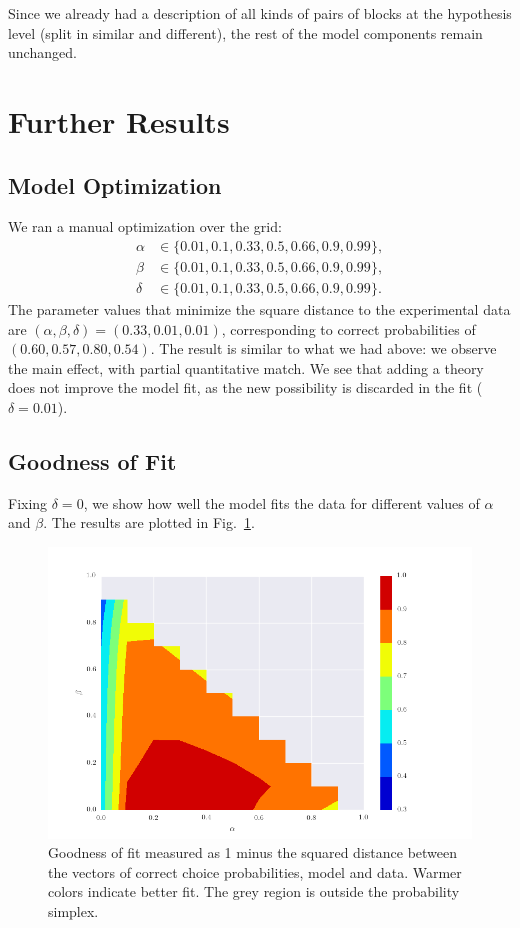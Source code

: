 \documentclass[11pt, a4paper]{article}
\begin{document}
Since we already had a description of all kinds of pairs of blocks at the hypothesis level (split in similar and different), the rest of the model components remain unchanged. 
 
\section*{Further Results}
\subsection*{Model Optimization}
We ran a manual optimization over the grid:
\begin{equation}
\begin{split}
\alpha&\in\{0.01, 0.1, 0.33, 0.5, 0.66, 0.9, 0.99\},\\
\beta&\in\{0.01, 0.1, 0.33, 0.5, 0.66, 0.9, 0.99\},\\
\delta&\in\{0.01, 0.1, 0.33, 0.5, 0.66, 0.9, 0.99\}.
\end{split}
\end{equation}
The parameter values that minimize the square distance to the experimental data are $(\alpha, \beta, \delta)=(0.33,0.01,0.01)$, corresponding to correct probabilities of $(0.60, 0.57, 0.80, 0.54)$. The result is similar to what we had above: we observe the main effect, with partial quantitative match. We see that adding a theory does not improve the model fit, as the new possibility is discarded in the fit ($\delta=0.01$). 
 
\subsection*{Goodness of Fit}
Fixing $\delta=0$, we show how well the model fits the data for different values of $\alpha$ and $\beta$. The results are plotted in Fig.~\ref{fig:GoF}.
 
\begin{figure}[ht]
\centering
\includegraphics[width=12cm]{Figures/GoF.png}
\caption{Goodness of fit measured as 1 minus the squared distance between the vectors of correct choice probabilities, model and data. Warmer colors indicate better fit. The grey region is outside the probability simplex.}
\label{fig:GoF}
\end{figure}
 
 
 
\end{document}
